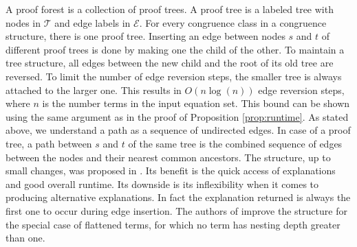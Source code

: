 A proof forest is a collection of proof trees.
A proof tree is a labeled tree with nodes in $\mathcal{T}$ and edge labels in $\mathcal{E}$.
For every congruence class in a congruence structure, there is one proof tree.
Inserting an edge between nodes $s$ and $t$ of different proof trees is done by making one the child of the other.
To maintain a tree structure, all edges between the new child and the root of its old tree are reversed.
To limit the number of edge reversion steps, the smaller tree is always attached to the larger one.
This results in $O(n \log(n))$ edge reversion steps, where $n$ is the number terms in the input equation set.
This bound can be shown using the same argument as in the proof of Proposition \ref{prop:runtime}.
As stated above, we understand a path as a sequence of undirected edges.
In case of a proof tree, a path between $s$ and $t$ of the same tree is the combined sequence of edges between the nodes and their nearest common ancestors.
The structure, up to small changes, was proposed in \cite{Nieuwenhuis2005,Nieuwenhuis2007}.
Its benefit is the quick access of explanations and good overall runtime.
Its downside is its inflexibility when it comes to producing alternative explanations.
In fact the explanation returned is always the first one to occur during edge insertion.
The authors of \cite{Nieuwenhuis2005,Nieuwenhuis2007} improve the structure for the special case of flattened terms, for which no term has nesting depth greater than one.





